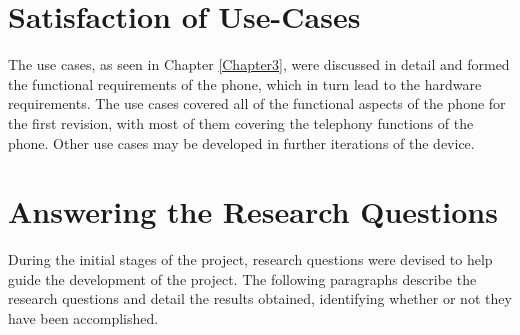
\section{Satisfaction of Use-Cases}

	The use cases, as seen in Chapter \ref{Chapter3}, were discussed in detail and formed the functional requirements of the phone, which in turn lead to the hardware requirements. 
The use cases covered all of the functional aspects of the phone for the first revision, with most of them covering the telephony functions of the phone.
Other use cases may be developed in further iterations of the device. 

\section{Answering the Research Questions}

During the initial stages of the project, research questions were devised to help guide the development of the project.
The following paragraphs describe the research questions and detail the results obtained, identifying whether or not they have been accomplished.\\

